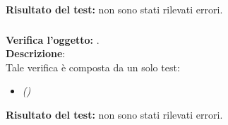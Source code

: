 \textbf{Risultato del test:} non sono stati rilevati errori.


\subsubsection{}
\textbf{Verifica l'oggetto:} \textit{}.\\
\textbf{Descrizione}:\\
Tale verifica è composta da un solo test:
\begin{itemize}
\item \textit{() }
\end{itemize}
\textbf{Risultato del test:} non sono stati rilevati errori.



